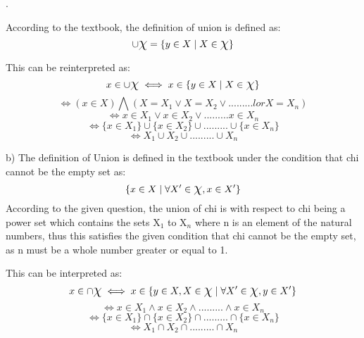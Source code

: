 \documentclass[11pt]{article}
\begin{document}
\begin{enumerate}
. 

According to the textbook, the definition of union is defined as: 
\begin{equation}
    \cup \mbox{\Large$\chi$} = \{y \in X \mid X \in \mbox{\Large$\chi$} \}
\end{equation}

This can be reinterpreted as: 
\begin{equation}
    x \in \cup \mbox{\Large$\chi$} \iff x \in \{ y \in X \mid X \in \mbox{\Large$\chi$} \}
\end{equation}
\begin{equation}
    \iff (x \in X) \bigwedge  (X = X_{1} \lor  X = X_{2} \lor ......... lor X = X_{n} )
\end{equation}
\begin{equation}
    \iff x \in X_{1} \lor x \in X_{2} \lor ......... x \in X_{n}
\end{equation}
\begin{equation}
    \iff \{ x\in X_{1} \} \cup \{x \in X_{2} \} \cup ......... \cup \{ x \in X_{n} \} 
\end{equation}
\begin{equation}
    \iff X_{1} \cup X_{2} \cup  ......... \cup X_{n}
\end{equation}

b) 
\newline The definition of Union is defined in the textbook under the condition that chi cannot be the empty set as: 
\begin{equation}
    \{ x\in X \mid \forall X' \in \mbox{\Large$\chi$}, x \in X' \}
\end{equation}
According to the given question, the union of chi is with respect to chi being a power set which contains the sets X$_{1}$ to X$_{n}$ where n is an element of the natural numbers, thus this satisfies the given condition that chi cannot be the empty set, as n must be a whole number greater or equal to 1. 

This can be interpreted as: 
\begin{equation}
    x \in \cap \mbox{\Large$\chi$} \iff x \in \{ y \in X, X \in \mbox{\Large$\chi$} \mid \forall X' \in \mbox{\Large$\chi$}, y \in X' \}
\end{equation}
\begin{equation}
    \iff x \in X_{1} \land x \in X_{2}  \land ......... \land x \in X_{n}
\end{equation}
\begin{equation}
    \iff \{ x \in X_{1} \} \cap  \{x \in X_{2} \} \cap  ......... \cap \{ x \in X_{n} \}
\end{equation}
\begin{equation}
    \iff X_{1} \cap X_{2} \cap  ......... \cap X_{n}
\end{equation}


\end{enumerate}
\end{document}
